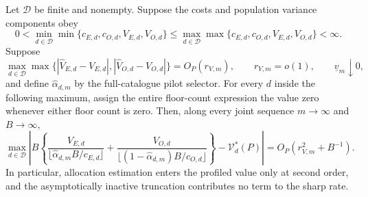 Let \(\mathcal D\) be finite and nonempty. Suppose the costs and population variance components obey
\[
0<\min_{d\in\mathcal D}\min\{c_{E,d},c_{O,d},V_{E,d},V_{O,d}\}
\le
\max_{d\in\mathcal D}\max\{c_{E,d},c_{O,d},V_{E,d},V_{O,d}\}<\infty.
\]
Suppose
\[
\max_{d\in\mathcal D}\max\bigl\{
|\widehat V_{E,d}-V_{E,d}|,
|\widehat V_{O,d}-V_{O,d}|\bigr\}=O_P(r_{V,m}),
\qquad r_{V,m}=o(1),
\qquad \underline v_m\downarrow0,
\]
and define \(\widehat\alpha_{d,m}\) by the full-catalogue pilot selector. For every \(d\) inside the following maximum, assign the entire floor-count expression the value zero whenever either floor count is zero. Then, along every joint sequence \(m\to\infty\) and \(B\to\infty\),
\[
\max_{d\in\mathcal D}\left|B\left\{
\frac{V_{E,d}}{\lfloor\widehat\alpha_{d,m}B/c_{E,d}\rfloor}
+\frac{V_{O,d}}{\lfloor(1-\widehat\alpha_{d,m})B/c_{O,d}\rfloor}
\right\}-\mathcal V_d^*(P)\right|
=O_P\!\left(r_{V,m}^2+B^{-1}\right).
\]
In particular, allocation estimation enters the profiled value only at second order, and the asymptotically inactive truncation contributes no term to the sharp rate.